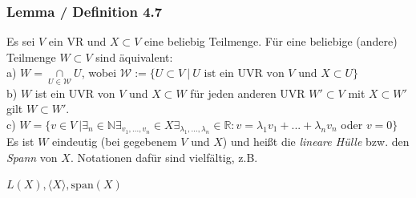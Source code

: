 \documentclass{article}
\begin{document}
\subsubsection*{Lemma / Definition 4.7}
Es sei $V$ ein VR und $X \subset V$ eine beliebig Teilmenge. Für eine beliebige (andere) Teilmenge $W \subset V$ sind äquivalent: \\
a) $W = \underset{U \in \mathcal{W}}{\cap} U$, wobei $\mathcal{W} := \{U \subset V \ | \ U \text{ ist ein UVR von } V \text{ und } X \subset U\}$ \\
b) $W$ ist ein UVR von $V$ und $X \subset W$ für jeden anderen UVR $W' \subset V$ mit $X \subset W'$ gilt $W \subset W'$. \\
c) $W = \{v \in V \ | \exists_n \in \mathbb{N} \exists_{v_1,...,v_n} \in X \exists_{\lambda_1,...,\lambda_n}\in \mathbb{R}: v = \lambda_1 v_1 + ... + \lambda_n v_n $ oder $ v=0\}$ \\
Es ist $W$ eindeutig (bei gegebenem $V$ und $X$) und heißt die \textit{lineare Hülle} bzw. den \textit{Spann} von $X$. Notationen dafür sind vielfältig, z.B. \\
\begin{center}
    $L(X), \langle X \rangle, \text{span}(X)$
\end{center}
\end{document}
